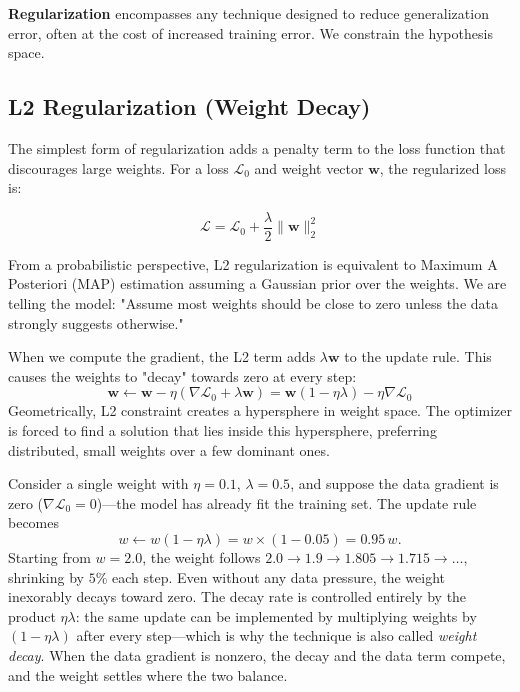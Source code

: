 \documentclass{tufte-handout}
\begin{document}
\textbf{Regularization} encompasses any technique designed to reduce generalization error, often at the cost of increased training error. We constrain the hypothesis space.

\subsection{L2 Regularization (Weight Decay)}

The simplest form of regularization adds a penalty term to the loss function that discourages large weights. For a loss $\mathcal{L}_0$ and weight vector $\mathbf{w}$, the regularized loss is:

\[
\mathcal{L} = \mathcal{L}_0 + \frac{\lambda}{2} \|\mathbf{w}\|_2^2
\]

\begin{marginfigure}[-2.0cm]
\centering
\begin{tcolorbox}[colback=wp-light, colframe=wp-accent, title=\textbf{Bayesian View of L2}]
From a probabilistic perspective, L2 regularization is equivalent to Maximum A Posteriori (MAP) estimation assuming a Gaussian prior over the weights. We are telling the model: "Assume most weights should be close to zero unless the data strongly suggests otherwise."
\end{tcolorbox}
\end{marginfigure}

When we compute the gradient, the L2 term adds $\lambda \mathbf{w}$ to the update rule. This causes the weights to "decay" towards zero at every step:
\[
\mathbf{w} \leftarrow \mathbf{w} - \eta (\nabla \mathcal{L}_0 + \lambda \mathbf{w}) = \mathbf{w}(1 - \eta\lambda) - \eta \nabla \mathcal{L}_0
\]
Geometrically, L2 constraint creates a hypersphere in weight space. The optimizer is forced to find a solution that lies inside this hypersphere, preferring distributed, small weights over a few dominant ones.

\begin{exmp}
Consider a single weight with $\eta = 0.1$, $\lambda = 0.5$, and suppose the data gradient is zero ($\nabla \mathcal{L}_0 = 0$)---the model has already fit the training set. The update rule becomes
\[
w \leftarrow w(1 - \eta\lambda) = w \times (1 - 0.05) = 0.95\,w.
\]
Starting from $w = 2.0$, the weight follows $2.0 \to 1.9 \to 1.805 \to 1.715 \to \dots$, shrinking by $5\%$ each step. Even without any data pressure, the weight inexorably decays toward zero. The decay rate is controlled entirely by the product $\eta\lambda$: the same update can be implemented by multiplying weights by $(1-\eta\lambda)$ after every step---which is why the technique is also called \emph{weight decay}. When the data gradient is nonzero, the decay and the data term compete, and the weight settles where the two balance.
\end{exmp}
\end{document}
